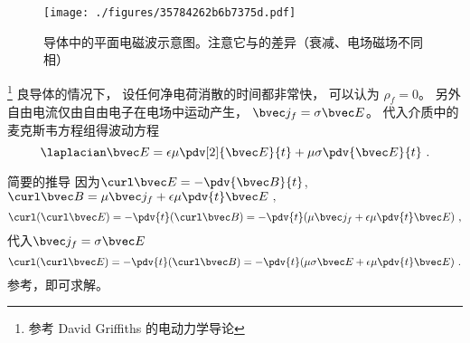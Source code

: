 
\begin{figure}[ht]
\centering
\texttt{[image: ./figures/35784262b6b7375d.pdf]}
\caption{导体中的平面电磁波示意图。注意它与的差异（衰减、电场磁场不同相）} \label{fig_MetalW_1}
\end{figure}

\footnote{参考 David Griffiths 的电动力学导论} 良导体的情况下， 设任何净电荷消散的时间都非常快， 可以认为 $\rho_f = 0$。 另外自由电流仅由自由电子在电场中运动产生， $\bvec j_f = \sigma \bvec E$。 代入介质中的麦克斯韦方程组得波动方程
\begin{equation}
\laplacian \bvec E = \epsilon \mu \pdv[2]{\bvec E}{t} + \mu\sigma \pdv{\bvec E}{t}~.
\end{equation}

\begin{example}{简要的推导}
因为$\curl\bvec E = -\pdv{\bvec B}{t}$, $\curl\bvec B = \mu \bvec j_f + \epsilon\mu \pdv{t} \bvec E~,$
\begin{equation}
\curl(\curl\bvec E) = -\pdv{t} (\curl\bvec B) =-\pdv{t}(\mu \bvec j_f + \epsilon\mu \pdv{t} \bvec E)~,
\end{equation}
代入$\bvec j_f = \sigma \bvec E$
\begin{equation}
\curl(\curl\bvec E) = -\pdv{t} (\curl\bvec B) =-\pdv{t}(\mu \sigma \bvec E + \epsilon\mu \pdv{t} \bvec E)~.
\end{equation}
参考，即可求解。
\end{example}


